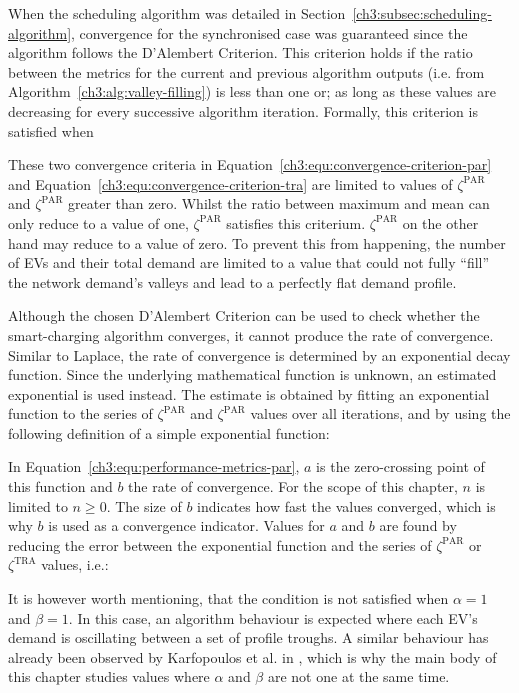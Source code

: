 When the scheduling algorithm was detailed in Section~\ref{ch3:subsec:scheduling-algorithm}, convergence for the synchronised case was guaranteed since the algorithm follows the D'Alembert Criterion.
This criterion holds if the ratio between the metrics for the current and previous algorithm outputs (i.e. from Algorithm~\ref{ch3:alg:valley-filling}) is less than one or; as long as these values are decreasing for every successive algorithm iteration.
Formally, this criterion is satisfied when



These two convergence criteria in Equation~\ref{ch3:equ:convergence-criterion-par} and Equation~\ref{ch3:equ:convergence-criterion-tra} are limited to values of $\zeta^\text{PAR}$ and $\zeta^\text{PAR}$ greater than zero.
Whilst the ratio between maximum and mean can only reduce to a value of one, $\zeta^\text{PAR}$ satisfies this criterium.
$\zeta^\text{PAR}$ on the other hand may reduce to a value of zero.
To prevent this from happening, the number of EVs and their total demand are limited to a value that could not fully ``fill'' the network demand's valleys and lead to a perfectly flat demand profile.

Although the chosen D'Alembert Criterion can be used to check whether the smart-charging algorithm converges, it cannot produce the rate of convergence.
Similar to Laplace, the rate of convergence is determined by an exponential decay function.
Since the underlying mathematical function is unknown, an estimated exponential is used instead.
The estimate is obtained by fitting an exponential function to the series of $\zeta^\text{PAR}$ and $\zeta^\text{PAR}$ values over all iterations, and by using the following definition of a simple exponential function:



In Equation~\ref{ch3:equ:performance-metrics-par}, $a$ is the zero-crossing point of this function and $b$ the rate of convergence.
For the scope of this chapter, $n$ is limited to $n \geq 0$.
The size of $b$ indicates how fast the values converged, which is why $b$ is used as a convergence indicator.
Values for $a$ and $b$ are found by reducing the error between the exponential function and the series of $\zeta^\text{PAR}$ or $\zeta^\text{TRA}$ values, i.e.:



It is however worth mentioning, that the condition is not satisfied when $\alpha = 1$ and $\beta = 1$.
In this case, an algorithm behaviour is expected where each EV's demand is oscillating between a set of profile troughs.
A similar behaviour has already been observed by Karfopoulos et al. in \cite{Karfopoulos2013}, which is why the main body of this chapter studies values where $\alpha$ and $\beta$ are not one at the same time.

